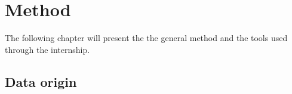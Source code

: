 \chapter{Method}
\label{ch:method}

The following chapter will present the the general method and the tools used through the internship.

\section{Data origin}
\label{sec:Data_origin}


